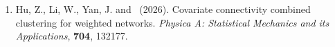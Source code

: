 \begin{enumerate}[resume=journalpubs]
\begin{pubentry}
\par\end{pubentry}
\item\begin{pubentry} {Hu, Z., Li, W., Yan, J.} and \PZ\ (2026). 
Covariate connectivity combined clustering for weighted networks. 
\emph{Physica A: Statistical Mechanics and its Applications}, 
\textbf{704}, 132177.
\par\end{pubentry}
\end{enumerate}
